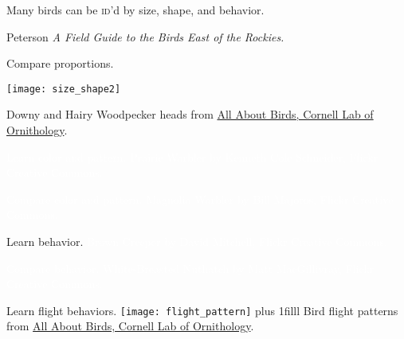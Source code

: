 \documentclass[t,handout]{beamer}  %
\begin{document}
{
\begin{frame}[t,plain]{Many birds can be \textsc{id}'d by size, shape, and behavior.}

	\vfilll
	
	\tiny\hfill{Peterson \textit{A Field Guide to the Birds East of the Rockies.}}
\end{frame}
}

\begin{frame}[b,plain]{Compare proportions.}
	\begin{center}
		\texttt{[image: size\_shape2]}
	\end{center}
	\tiny Downy and Hairy Woodpecker heads from \href{http://allaboutbirds.com}{All About Birds, Cornell Lab of Ornithology}.
\end{frame}


{
\begin{frame}[b,plain]{\hfill\textcolor{white}{Learn color and pattern.}}
	\tiny\textcolor{white}{Prairie Warbler by Kenneth Cole Schneider, Flickr Creative Commons.}
\end{frame}
}

{
\begin{frame}[b,plain]{\hfill\textcolor{white}{Compare color and pattern.}}
	\tiny\textcolor{white}{Magnolia Warbler by Bill Majoros, Flickr Creative Commons.}
\end{frame}
}

{
\begin{frame}[b,plain]{Learn behavior.}
	\tiny\hfill\textcolor{white}{Brown Creeper by David Mitchell, Flickr Creative Commons.}
\end{frame}
}

{
\begin{frame}[b,plain]{\hfill\textcolor{white}{Compare behavior.}}
	\tiny\textcolor{white}{White-Breasted Nuthatch by Matt MacGillivray, Flickr Creative Commons.}
\end{frame}
}

{
\begin{frame}[c,plain]{Learn flight behaviors.}
	\texttt{[image: flight\_pattern]}
\vskip0pt plus 1filll	
	\hfill\tiny Bird flight patterns from \href{http://allaboutbirds.com}{All About Birds, Cornell Lab of Ornithology}.
\end{frame}
}
\end{document}
